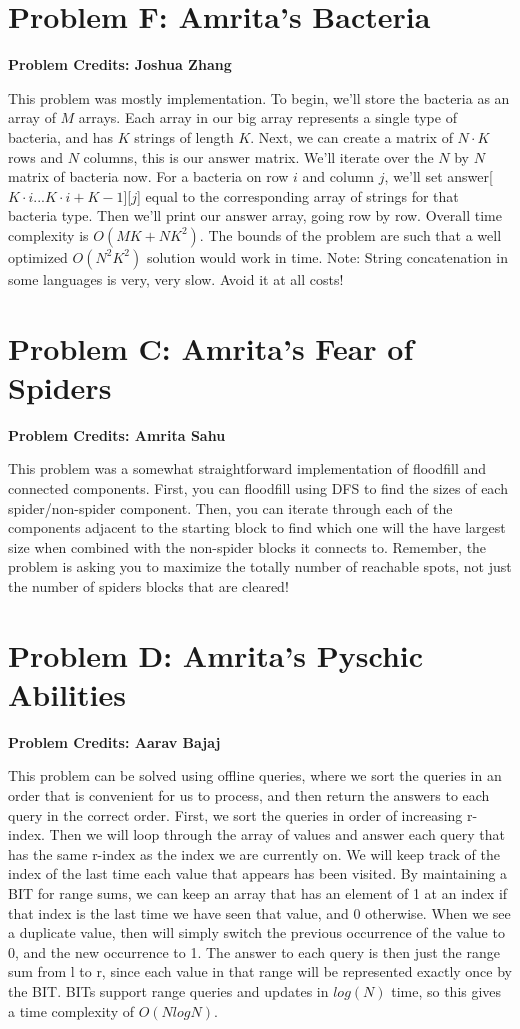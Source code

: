 \documentclass{article}
\begin{document}
\section{Problem F: Amrita's Bacteria}
\textbf{Problem Credits: Joshua Zhang}

This problem was mostly implementation. To begin, we'll store the bacteria as an array of $M$ arrays. Each array in our big array represents a single type of bacteria, and has $K$ strings of length $K$. Next, we can create a matrix of $N \cdot K$ rows and $N$ columns, this is our answer matrix. We'll iterate over the $N$ by $N$ matrix of bacteria now. For a bacteria on row $i$ and column $j$, we'll set answer[$K \cdot i...K \cdot i + K - 1$][$j$] equal to the corresponding array of strings for that bacteria type. Then we'll print our answer array, going row by row. Overall time complexity is $O(MK+NK^2)$. The bounds of the problem are such that a well optimized $O(N^2K^2)$ solution would work in time. Note: String concatenation in some languages is very, very slow. Avoid it at all costs!

\section{Problem C: Amrita's Fear of Spiders}
\textbf{Problem Credits: Amrita Sahu}

\noindent This problem was a somewhat straightforward implementation of floodfill and connected components. First, you can floodfill using DFS to find the sizes of each spider/non-spider component. Then, you can iterate through each of the components adjacent to the starting block to find which one will the have largest size when combined with the non-spider blocks it connects to. Remember, the problem is asking you to maximize the totally number of reachable spots, not just the number of spiders blocks that are cleared!

\section{Problem D: Amrita's Pyschic Abilities}
\textbf{Problem Credits: Aarav Bajaj}

\noindent This problem can be solved using offline queries, where we sort the queries in an order that is convenient for us to process, and then return the answers to each query in the correct order. First, we sort the queries in order of increasing r-index. Then we will loop through the array of values and answer each query that has the same r-index as the index we are currently on. We will keep track of the index of the last time each value that appears has been visited. By maintaining a BIT for range sums, we can keep an array that has an element of 1 at an index if that index is the last time we have seen that value, and 0 otherwise. When we see a duplicate value, then will simply switch the previous occurrence of the value to 0, and the new occurrence to 1. The answer to each query is then just the range sum from l to r, since each value in that range will be represented exactly once by the BIT. BITs support range queries and updates in $log(N)$ time, so this gives a time complexity of $O(NlogN)$.
\end{document}
